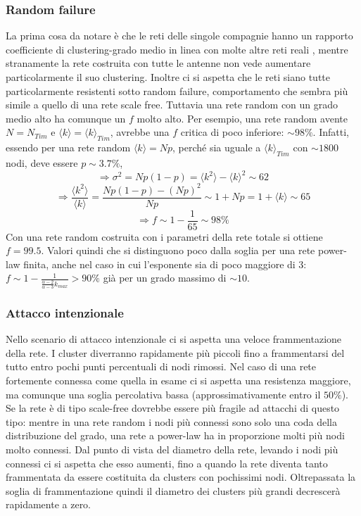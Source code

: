 \subsubsection{Random failure}
La prima cosa da notare è che le reti delle singole compagnie hanno un rapporto coefficiente di clustering-grado medio in linea con molte altre reti reali \parencite{Barbalbert2002}, mentre stranamente la rete costruita con tutte le antenne non vede aumentare particolarmente il suo clustering. Inoltre ci si aspetta che le reti siano tutte particolarmente resistenti sotto random failure, comportamento che sembra più simile a quello di una rete scale free. Tuttavia una rete random con un grado medio alto ha comunque un $f$ molto alto. Per esempio, una rete random avente $N = N_{Tim}$ e $\langle k \rangle = \langle k \rangle_{Tim}$, avrebbe una $f$ critica di poco inferiore: $\sim 98\%$. Infatti, essendo per una rete random $\langle k \rangle = Np$, perché sia uguale a $\langle k \rangle_{Tim}$ con $\sim 1800$ nodi, deve essere $p \sim 3.7\%$, 
$$\Rightarrow \sigma^2 = Np(1-p) = \langle k^2 \rangle - \langle k \rangle^2 \sim 62$$
$$\Rightarrow \frac{\langle k^2 \rangle }{\langle k \rangle} = \frac{Np(1-p)-(Np)^2}{Np} \sim 1+Np = 1+ \langle k \rangle \sim 65$$
$$\Rightarrow f \sim 1 - \frac{1}{65} \sim 98\%$$
Con una rete random costruita con i parametri della rete totale si ottiene $f = 99.5$. Valori quindi che si distinguono poco dalla soglia per una rete power-law finita, anche nel caso in cui l'esponente sia di poco maggiore di 3: $f \sim 1 - \frac{1}{\frac{\alpha - 2}{\alpha-3}k_{max}} > 90\%$ già per un grado massimo di $\sim10$.


\subsubsection{Attacco intenzionale}
Nello scenario di attacco intenzionale ci si aspetta una veloce frammentazione della rete. I cluster diverranno rapidamente più piccoli fino a frammentarsi del tutto entro pochi punti percentuali di nodi rimossi. Nel caso di una rete fortemente connessa come quella in esame ci si aspetta una resistenza maggiore, ma comunque una soglia percolativa bassa (approssimativamente entro il $50\%$). Se la rete è di tipo scale-free dovrebbe essere più fragile ad attacchi di questo tipo: mentre in una rete random i nodi più connessi sono solo una coda della distribuzione del grado, una rete a power-law ha in proporzione molti più nodi molto connessi.
Dal punto di vista del diametro della rete, levando i nodi più connessi ci si aspetta che esso aumenti, fino a quando la rete diventa tanto frammentata da essere costituita da clusters con pochissimi nodi. Oltrepassata la soglia di frammentazione quindi il diametro dei clusters più grandi decrescerà rapidamente a zero.

